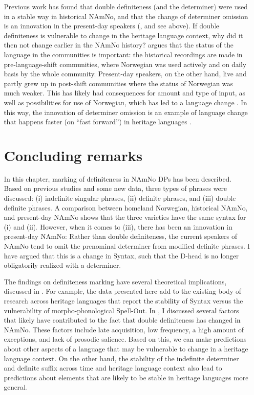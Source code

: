 \documentclass[output=paper]{langscibook}
\begin{document}
Previous work has found that double definiteness (and the determiner) were used in a stable way in historical NAmNo, and that the change of determiner omission is an innovation in the present-day speakers (\citealt{vanBaal2022New}, and see  above). If double definiteness is vulnerable to change in the heritage language context, why did it then not change earlier in the NAmNo history?  argues that the status of the language in the communities is important: the historical recordings are made in pre\hyp language\hyp shift communities, where Norwegian was used actively and on daily basis by the whole community. Present-day speakers, on the other hand, live and partly grew up in post-shift communities where the status of Norwegian was much weaker. This has likely had consequences for amount and type of input, as well as possibilities for use of Norwegian, which has led to a language change \citep[cf.][]{EideHjelde2023}. In this way, the innovation of determiner omission is an example of language change that happens faster (on “fast forward”) in heritage languages \citep{KupischPolinsky2022}.
 

\section{Concluding remarks} \label{Sect-SummaryConclusion}
In this chapter, marking of definiteness in NAmNo DPs has been described. Based on previous studies and some new data, three types of phrases were discussed: (i) indefinite singular phrases, (ii) definite phrases, and (iii) double definite phrases. A comparison between homeland Norwegian, historical NAmNo, and present-day NAmNo shows that the three varieties have the same syntax for (i) and (ii). However, when it comes to (iii), there has been an innovation in present-day NAmNo: Rather than double definiteness, the current speakers of NAmNo tend to omit the prenominal determiner from modified definite phrases. I have argued that this is a change in Syntax, such that the D-head is no longer obligatorily realized with a determiner.
 
The findings on definiteness marking have several theoretical implications, discussed in . For example, the data presented here add to the existing body of research across heritage languages that report the stability of Syntax versus the vulnerability of morpho-phonological Spell-Out. In , I discussed several factors that likely have contributed to the fact that double definiteness has changed in NAmNo. These factors include late acquisition, low frequency, a high amount of exceptions, and lack of prosodic salience. Based on this, we can make predictions about other aspects of a language that may be vulnerable to change in a heritage language context. On the other hand, the stability of the indefinite determiner and definite suffix across time and heritage language context also lead to predictions about elements that are likely to be stable in heritage languages more general.
 
\end{document}
